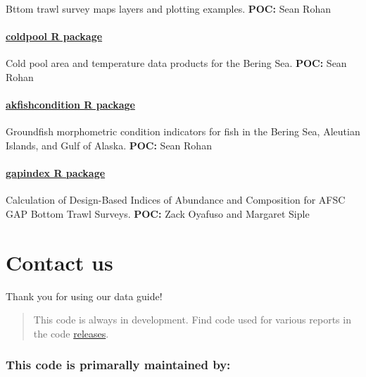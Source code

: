 \documentclass[
  letterpaper,
  oneside,
  open=any]{scrbook}
\begin{document}
Bttom trawl survey maps layers and plotting examples. \textbf{POC:} Sean
Rohan

\subsection{\texorpdfstring{\href{https://github.com/afsc-gap-products/coldpool}{coldpool
R package}}{coldpool R package}}\label{coldpool-r-package}

Cold pool area and temperature data products for the Bering Sea.
\textbf{POC:} Sean Rohan

\subsection{\texorpdfstring{\href{https://github.com/afsc-gap-products/akfishcondition}{akfishcondition
R package}}{akfishcondition R package}}\label{akfishcondition-r-package}

Groundfish morphometric condition indicators for fish in the Bering Sea,
Aleutian Islands, and Gulf of Alaska. \textbf{POC:} Sean Rohan

\subsection{\texorpdfstring{\href{https://github.com/afsc-gap-products/gapindex}{gapindex
R package}}{gapindex R package}}\label{gapindex-r-package}

Calculation of Design-Based Indices of Abundance and Composition for
AFSC GAP Bottom Trawl Surveys. \textbf{POC:} Zack Oyafuso and Margaret
Siple

\part{Contact us}

Thank you for using our data guide!

\begin{quote}
This code is always in development. Find code used for various reports
in the code
\href{https://github.com/afsc-gap-products/gap_products/releases}{releases}.
\end{quote}

\section*{This code is primarally maintained
by:}\label{this-code-is-primarally-maintained-by}
\end{document}
